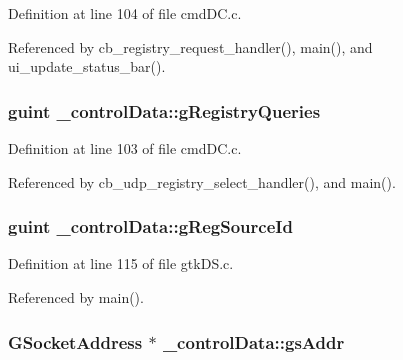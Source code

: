 Definition at line 104 of file cmd\+D\+C.\+c.



Referenced by cb\+\_\+registry\+\_\+request\+\_\+handler(), main(), and ui\+\_\+update\+\_\+status\+\_\+bar().

\subsubsection[{\texorpdfstring{g\+Registry\+Queries}{gRegistryQueries}}]{\setlength{\rightskip}{0pt plus 5cm}guint \+\_\+control\+Data\+::g\+Registry\+Queries}\hypertarget{struct__control_data_ab4837eb7cc16bf85fe0bd839a428eaa5}{}\label{struct__control_data_ab4837eb7cc16bf85fe0bd839a428eaa5}


Definition at line 103 of file cmd\+D\+C.\+c.



Referenced by cb\+\_\+udp\+\_\+registry\+\_\+select\+\_\+handler(), and main().

\subsubsection[{\texorpdfstring{g\+Reg\+Source\+Id}{gRegSourceId}}]{\setlength{\rightskip}{0pt plus 5cm}guint \+\_\+control\+Data\+::g\+Reg\+Source\+Id}\hypertarget{struct__control_data_a96ccde7cdcba6f4f52f472f95ddaf782}{}\label{struct__control_data_a96ccde7cdcba6f4f52f472f95ddaf782}


Definition at line 115 of file gtk\+D\+S.\+c.



Referenced by main().

\subsubsection[{\texorpdfstring{gs\+Addr}{gsAddr}}]{\setlength{\rightskip}{0pt plus 5cm}G\+Socket\+Address $\ast$ \+\_\+control\+Data\+::gs\+Addr}\hypertarget{struct__control_data_a8a43853386551af4c746fd4b882eb2bf}{}\label{struct__control_data_a8a43853386551af4c746fd4b882eb2bf}


